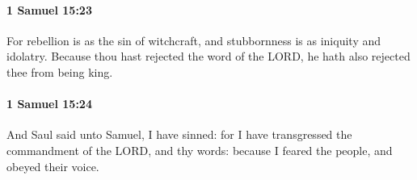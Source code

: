 		\paragraph{1 Samuel 15:23} %
			\label{1SAMUEL-15-23}

			For rebellion is as the sin of witchcraft, and stubbornness is as iniquity and idolatry. Because thou hast rejected the word of the LORD, he hath also rejected thee from being king.


		\paragraph{1 Samuel 15:24} %
			\label{1SAMUEL-15-24}

			And Saul said unto Samuel, I have sinned: for I have transgressed the commandment of the LORD, and thy words: because I feared the people, and obeyed their voice.


